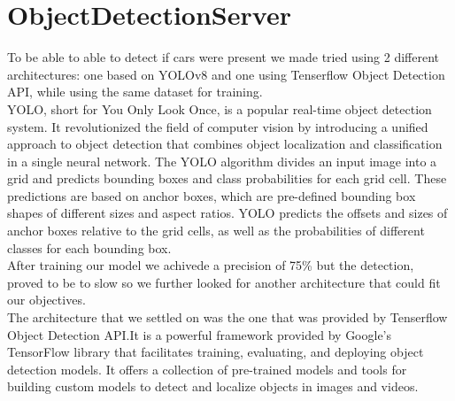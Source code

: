 \documentclass[17pt]{report}
\begin{document}
\pagebreak
\section{ObjectDetectionServer} 
\indent \indent
To be able to able to detect if cars were present we made tried using 2 different 
architectures: one based on YOLOv8 and one using Tenserflow Object Detection API, 
while using the same dataset for training.\\
\indent
YOLO, short for You Only Look Once, is a popular real-time object detection system.
It revolutionized the field of computer vision by introducing a unified approach to
object detection that combines object localization and classification in a single
neural network. The YOLO algorithm divides an input image into a grid and predicts
bounding boxes and class probabilities for each grid cell. These predictions are
based on anchor boxes, which are pre-defined bounding box shapes of different sizes
and aspect ratios. YOLO predicts the offsets and sizes of anchor boxes relative to
the grid cells, as well as the probabilities of different classes for each bounding
box. \\
\indent
After training our model we achivede a precision of 75\% but the detection, proved 
to be to slow so we further looked for another architecture that could fit our objectives. \\
\indent
The architecture that we settled on was the one that was provided by Tenserflow
Object Detection API.It is a powerful framework provided by Google's TensorFlow
library that facilitates training, evaluating, and deploying object detection
models. It offers a collection of pre-trained models and tools for building custom
models to detect and localize objects in images and videos. 
\end{document}
